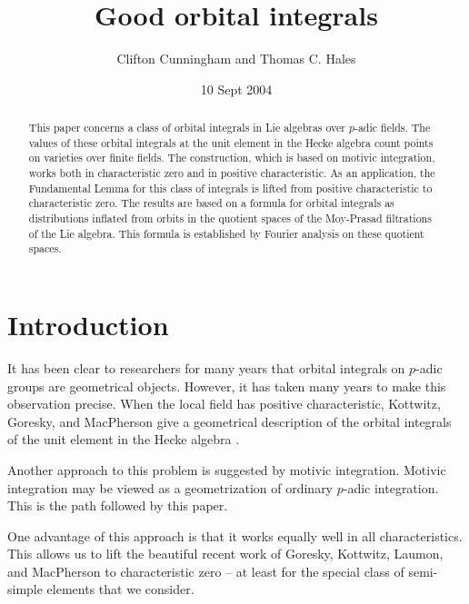 \documentclass[11pt]{amsart}
\title{Good orbital integrals}
\date{10 Sept 2004}
\author{Clifton Cunningham and Thomas C. Hales}
\theoremstyle{definition}
\theoremstyle{remark}
\numberwithin{equation}{theorem}
\begin{document}
\newcommand{\FF}{{\mathbb{F}}}

\begin{abstract}
This paper concerns a class of orbital integrals in Lie algebras
over $p$-adic fields.  The values of these orbital integrals at
the unit element in the Hecke algebra count points on varieties
over finite fields.  The construction, which is based on motivic
integration, works both in characteristic zero and in positive
characteristic. As an application, the Fundamental Lemma for this
class of integrals is lifted from positive characteristic to
characteristic zero.  The results are based on a formula for
orbital integrals as distributions inflated from orbits in the
quotient spaces of the Moy-Prasad filtrations of the Lie algebra.
This formula is established by Fourier analysis on these quotient
spaces.
\end{abstract}

\maketitle


\def\today{\ifcase\month\or
    January\or February\or March\or April\or May\or June\or
    July\or August\or September\or October\or November\or December\fi
    \space\number\day, \number\year}

\maketitle

\section*{Introduction}\label{section: introduction}

It has been clear to researchers for many years that orbital
integrals on $p$-adic groups are geometrical objects.  However, it
has taken many years to make this observation precise.  When the
local field has positive characteristic, Kottwitz, Goresky, and
MacPherson give a geometrical description of the orbital integrals
of the unit element in the Hecke algebra \cite{GKM-fl}.

Another approach to this problem is suggested by motivic
integration.  Motivic integration may be viewed as a
geometrization of ordinary $p$-adic integration.  This is the path
followed by this paper.

One advantage of this approach is that it works equally well in
all characteristics.  This allows us to lift the beautiful recent
work of Goresky, Kottwitz, Laumon, and MacPherson to
characteristic zero -- at least for the special class of
semi-simple elements that we consider.
\end{document}
